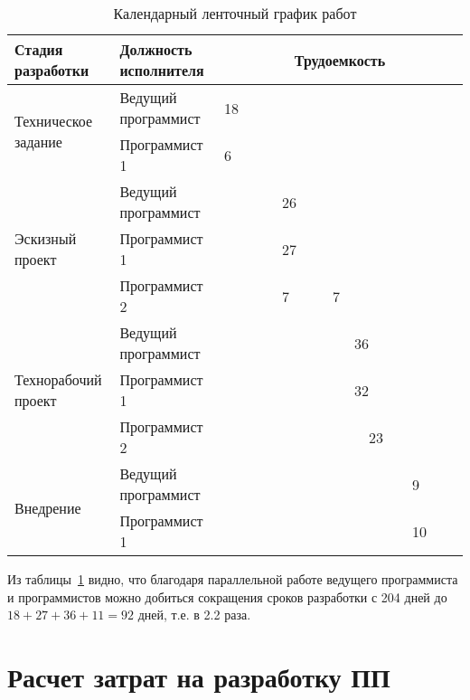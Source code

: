 \begin{table}[ht]\footnotesize
\caption{Календарный ленточный график работ}
\begin{tabular}{|l|l|llll|llll|llll|llll|}
\hline
Стадия разработки & Должность исполнителя & \multicolumn{16}{c|}{Трудоемкость} \\ 
\hline
\multirow{2}{0.2\textwidth}{Техническое задание} & Ведущий программист & \multicolumn{4}{l|}{\cellcolor[gray]{0.6}18} & & & & & & & & & & & &\\
& Программист 1 & \multicolumn{2}{l|}{\cellcolor[gray]{0.8}6} & {} & {} & & & & & & & & & & & & \\
\hline
\multirow{3}{0.2\textwidth}{Эскизный проект} & Ведущий программист & & & & & \multicolumn{4}{l|}{\cellcolor[gray]{0.8}26} & & & & & & & & \\
& Программист 1 & & & & & \multicolumn{4}{l|}{\cellcolor[gray]{0.6}27} & & & & & & & &\\
& Программист 2 & & & & &  \cellcolor[gray]{0.8}7 & {} & {} & \cellcolor[gray]{0.8}7 & & & & & & & & \\
\hline
\multirow{3}{0.2\textwidth}{Технорабочий проект} & Ведущий программист & & & & & & & & &\multicolumn{4}{l|}{\cellcolor[gray]{0.6}36} & & & & \\
& Программист 1 & & & & & & & & &\multicolumn{4}{l|}{\cellcolor[gray]{0.8}32} & & & & \\
& Программист 2 & & & & & & & & & {} & \multicolumn{3}{l|}{\cellcolor[gray]{0.8}23} & {} & & & \\
\hline
\multirow{2}{0.2\textwidth}{Внедрение} & Ведущий программист & & & & & & & & & & & & &\multicolumn{4}{l|}{\cellcolor[gray]{0.8}9} \\
& Программист 1 & & & & & & & & & & & & & \multicolumn{4}{l|}{\cellcolor[gray]{0.6}10}\\
\hline
\end{tabular}
\label{tab:timeline}
\end{table}

\normalsize 

Из таблицы~\ref{tab:timeline} видно, что благодаря параллельной работе ведущего программиста и программистов можно добиться сокращения сроков разработки с  204 дней до $18 + 27  + 36 + 11 = 92$ дней, т.е. в 2.2 раза.

\section{Расчет затрат на разработку ПП}

